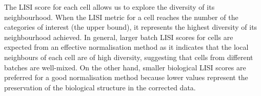 \documentclass[]{article}
\newcommand{\hlnum}[1]{\textcolor[rgb]{0.816,0.125,0.439}{#1}}%
\newcommand{\hlstr}[1]{\textcolor[rgb]{0.251,0.627,0.251}{#1}}%
\newcommand{\hlstd}[1]{\textcolor[rgb]{0.251,0.251,0.251}{#1}}%
\newcommand{\hlkwd}[1]{\textcolor[rgb]{0.878,0.439,0.125}{#1}}%
\newenvironment{Shaded}{\begin{myshaded}}{\end{myshaded}}
\newcommand{\DecValTok}[1]{\hlnum{#1}}
\newcommand{\ConstantTok}[1]{\hlnum{#1}}
\newcommand{\SpecialCharTok}[1]{\hlstr{#1}}
\newcommand{\StringTok}[1]{\hlstr{#1}}
\newcommand{\OtherTok}[1]{{#1}}
\newcommand{\FunctionTok}[1]{\hlstd{#1}}
\newcommand{\ControlFlowTok}[1]{\hlkwd{#1}}
\newcommand{\NormalTok}[1]{\hlstd{#1}}
\begin{document}
\begin{Shaded}
\end{Shaded}

The LISI score for each cell allows us to explore the diversity of its neighbourhood. When the LISI metric for a cell reaches the number of the categories of interest (the upper bound), it represents the highest diversity of its neighbourhood achieved. In general, larger batch LISI scores for cells are expected from an effective normalisation method as it indicates that the local neighbours of each cell are of high diversity, suggesting that cells from different batches are well-mixed. On the other hand, smaller biological LISI scores are preferred for a good normalisation method because lower values represent the preservation of the biological structure in the corrected data.
\end{document}
